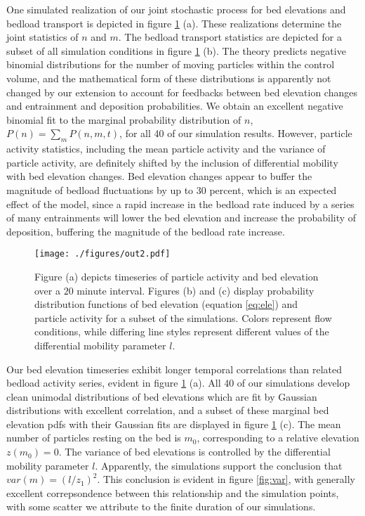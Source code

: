 \documentclass[draft]{agujournal2018}
\begin{document}
One simulated realization of our joint stochastic process for bed elevations and bedload transport is depicted in figure \ref{fig:pdfs} (a). 
These realizations determine the joint statistics of $n$ and $m$. 
The bedload transport statistics are depicted for a subset of all simulation conditions in figure \ref{fig:pdfs} (b). 
The \citet{Ancey2008} theory predicts negative binomial distributions for the number of moving particles within the control volume, and the mathematical form of these distributions is apparently not changed by our extension to account for feedbacks between bed elevation changes and entrainment and deposition probabilities.
We obtain an excellent negative binomial fit to the marginal probability distribution of $n$, $P(n) = \sum_m P(n,m,t)$, for all 40 of our simulation results.
However, particle activity statistics, including the mean particle activity and the variance of particle activity, are definitely shifted by the inclusion of differential mobility with bed elevation changes.
Bed elevation changes appear to buffer the magnitude of bedload fluctuations by up to 30 percent, which is an expected effect of the model, since a rapid increase in the bedload rate induced by a series of many entrainments will lower the bed elevation and increase the probability of deposition, buffering the magnitude of the bedload rate increase.

\begin{figure}[t!]
  \texttt{[image: ./figures/out2.pdf]}
  \caption{Figure (a) depicts timeseries of particle activity and bed elevation over a $20$ minute interval. Figures (b) and (c) display probability distribution functions of bed elevation (equation \ref{eq:ele}) and particle activity for a subset of the simulations. Colors represent flow conditions, while differing line styles represent different values of the differential mobility parameter $l$.}
\vspace{-1.0cm}
  \label{fig:pdfs}
\end{figure}

Our bed elevation timeseries exhibit longer temporal correlations than related bedload activity series, evident in figure \ref{fig:pdfs} (a). 
All 40 of our simulations develop clean unimodal distributions of bed elevations which are fit by Gaussian distributions with excellent correlation, and a subset of these marginal bed elevation pdfs with their Gaussian fits are displayed in figure \ref{fig:pdfs} (c). 
The mean number of particles resting on the bed is $m_0$, corresponding to a relative elevation $z(m_0)=0$. 
The variance of bed elevations is controlled by the differential mobility parameter $l$. 
Apparently, the simulations support the conclusion that $var(m) = (l/z_1)^2$. 
This conclusion is evident in figure \ref{fig:var}, with generally excellent correpsondence between this relationship and the simulation points, with some scatter we attribute to the finite duration of our simulations.
\end{document}
